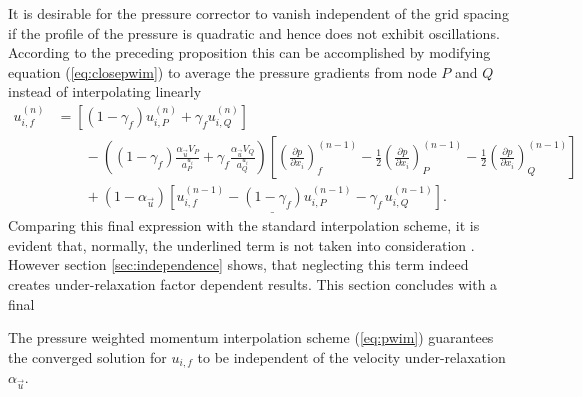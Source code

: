 It is desirable for the pressure corrector to vanish independent of the grid spacing if the profile of the pressure is quadratic and hence does not exhibit oscillations. According to the preceding proposition this can be accomplished by modifying equation (\ref{eq:closepwim}) to average the pressure gradients from node \(P\) and \(Q\) instead of interpolating linearly
\begin{align}
  u_{i,f}^{(n)} 
  &=
  \left[\left(1 - \gamma_f\right) u_{i,P}^{(n)} + \gamma_f u_{i,Q}^{(n)} \right] \nonumber\\[1em]
  &\quad\quad - 
  \left(\left(1 - \gamma_f\right) \frac{\alpha_\vec{u} V_P}{a_P^{u_i}} + \gamma_f \frac{\alpha_\vec{u} V_Q}{a_Q^{u_i}}\right)
  \left[ 
  \left(\frac{\partial p}{\partial x_i}\right)_f^{(n-1)} 
  - \frac{1}{2} \left( \frac{\partial p}{\partial x_i} \right)_P^{(n-1)} 
  - \frac{1}{2} \left(\frac{\partial p}{\partial x_i}\right)_Q^{(n-1)}
  \right] \nonumber \\[1em]
  \label{eq:pwim}
  &\quad\quad + \underline{\left(1 - \alpha_\vec{u}\right) \left[ u_{i,f}^{(n-1)} - \left(1 - \gamma_f\right) u_{i,P}^{(n-1)} - \gamma_f \, u_{i,Q}^{(n-1)} \right]}.
\end{align}
Comparing this final expression with the standard interpolation scheme, it is evident that, normally, the underlined term is not taken into consideration \cite{ferziger02}. However section \ref{sec:independence} shows, that neglecting this term indeed creates under-relaxation factor dependent results. This section concludes with a final
\begin{prop}
  The pressure weighted momentum interpolation scheme (\ref{eq:pwim}) guarantees the converged solution for \(u_{i,f}\) to be independent of the velocity under-relaxation \(\alpha_\vec{u}\).
\end{prop}
